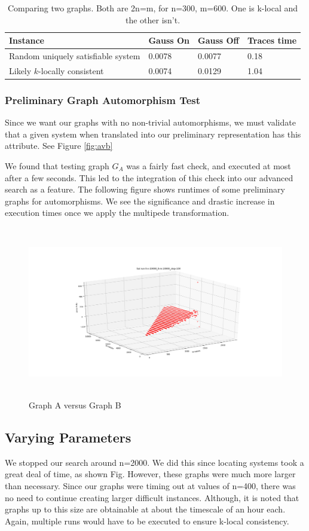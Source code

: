 \begin{table}[h]
	\centering
	\begin{tabular}{l l l l}
		\toprule
		Instance & Gauss On & Gauss Off & Traces time  \\ 
		\midrule
		Random uniquely satisfiable system & 0.0078 & 0.0077 & 0.18 \\
		Likely $k$-locally consistent & 0.0074 & 0.0129 & 1.04 \\
		\bottomrule
	\end{tabular}
	\label{tab:tx}
	\caption{Comparing two graphs. Both are 2n=m, for n=300, m=600. One is k-local and the other isn't.}
\end{table}
 

\subsubsection{Preliminary Graph Automorphism Test}
Since we want our graphs with no non-trivial automorphisms, we must validate that a given system when translated into our preliminary representation has this attribute. See Figure \ref{fig:avb}
\par
We found that testing graph $G_A$ was a fairly fast check, and executed at most after a few seconds. This led to the integration of this check into our advanced search as a feature. The following figure shows runtimes of some preliminary graphs for automorphisms. We see the significance and drastic increase in execution times once we apply the multipede transformation.  
\begin{figure}[htbp!] 
	\centering
	\includegraphics[height=75mm]{Figs/diff_3d}
	\caption{Graph A versus Graph B}
	\label{avb}
\end{figure}

\subsection{Varying Parameters}
We stopped our search around n=2000. We did this since locating systems took a great deal of time, as shown Fig. However, these graphs were much more larger than necessary. Since our graphs were timing out at values of n=400, there was no need to continue creating larger difficult instances. Although, it is noted that graphs up to this size are obtainable at about the timescale of an hour each. Again, multiple runs would have to be executed to ensure k-local consistency. 
\newpage
